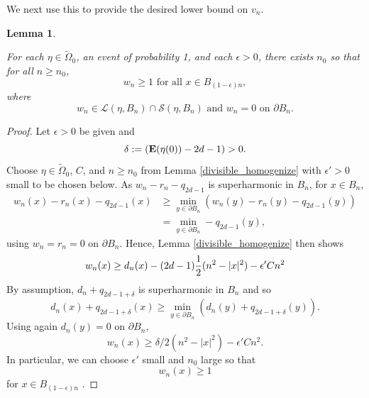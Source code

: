 \documentclass[12pt]{amsart}
\newcommand{\E}{\mathop{\bf E{}}}
\newtheorem{lemma}[theorem]{Lemma}
\begin{document}
We next use this to provide the desired lower bound on $v_n$. 

\begin{lemma}\label{lowerbound}

For each $\eta \in \tilde{\Omega}_0$, an event of probability 1, and each $\epsilon > 0$, there exists $n_0$ so that for all $n \geq n_0$, 
\[
w_n \geq 1 \mbox{ for all $x \in B_{(1-\epsilon)n}$}, 
\]
where
\[
w_n \in \mathcal{L}(\eta, B_{n}) \cap \mathcal{S}(\eta,B_{n}) \mbox{ and $w_n = 0$ on $\partial B_{n}$}. 
\]

\end{lemma}


\begin{proof}
Let $\epsilon > 0$ be given
and   
\[
\delta := \left( \E(\eta(0)) - 2 d - 1\right) > 0. 
\]
Choose $\eta \in \tilde{\Omega}_0$, $C$, and $n \geq n_0$ from Lemma \ref{divisible_homogenize} with $\epsilon'  > 0$ small
to be chosen below. As $w_n - r_n - q_{2 d- 1}$ is superharmonic in $B_{n}$,  for $x \in B_{n}$, 
\begin{align*}
w_n(x) - r_n(x) - q_{2 d- 1}(x)  &\geq  \min_{ y \in \partial B_{n}}  \left( w_n(y) -r_n(y)- q_{2 d- 1}(y) \right) \\
&= \min_{ y \in \partial B_{n}} -q_{2 d- 1}(y),
\end{align*}
using  $w_n = r_n = 0$ on $\partial B_{n}$.
Hence, Lemma \ref{divisible_homogenize} then shows 
\[
w_n(x) \geq d_n(x)  -(2d-1) \frac{1}{2}(n^2-|x|^2) - \epsilon' C n^2 \\
\]
By assumption, $d_n + q_{2 d- 1+\delta}$ is superharmonic in $B_{n}$ and so 
\[
d_n(x) + q_{2 d- 1+\delta}(x) \geq  \min_{ y \in \partial B_{n}}\left( d_n(y) + q_{2 d- 1+\delta}(y) \right).
\]
Using again $d_n(y) =0$ on $\partial B_n$, 
\[
w_n(x) \geq  \delta/2 (n^2 - |x|^2) - \epsilon' C n^2.  
\]
In particular, we can choose $\epsilon'$ small and $n_0$ large so that
\[
w_n(x) \geq 1
\]
for $x \in B_{(1-\epsilon) n}$ . 
\end{proof}





\end{document}
